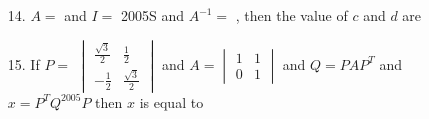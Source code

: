 \documentclass[journal,12pt,twocolumn]{IEEEtran}
\theoremstyle{remark}
\begin{document}
\begin{enumerate}
	\item[14.] $A=$  and $I=$  \hfill{2005S}
		and $A^{-1} = $ , then the value of $c$ and $d$ are \hfill{}
	\begin{enumerate}[label =(\alph*)]
		\end{enumerate}
	

	\item[15.] If $P=$ 
		$\begin{vmatrix}
			\frac{\sqrt{3}}{2} & \frac{1}{2}\\
			-\frac{1}{2} & \frac{\sqrt{3}}{2}
			\end{vmatrix}$ and $A = \begin{vmatrix} 1& 1 \\ 0 & 1\end{vmatrix}$ and $Q = PAP^T$ and $x=P^{T}Q^{2005}P$ then $x$ is equal to 



\end{enumerate}
\end{document}
